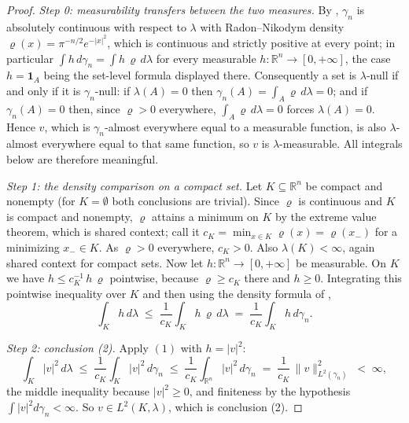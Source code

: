 \begin{proof}
\emph{Step 0: measurability transfers between the two measures.}
By , $\gamma_n$ is absolutely continuous with respect to
$\lambda$ with Radon--Nikodym density $\varrho(x) = \pi^{-n/2}e^{-|x|^2}$, which
is continuous and strictly positive at every point; in particular
$\int h \, d\gamma_n = \int h\,\varrho \, d\lambda$ for every measurable
$h : \mathbb{R}^n \to [0,+\infty]$, the case $h = \mathbf{1}_A$ being the
set-level formula displayed there.  Consequently a set is $\lambda$-null if and
only if it is $\gamma_n$-null: if $\lambda(A) = 0$ then
$\gamma_n(A) = \int_A \varrho \, d\lambda = 0$; and if $\gamma_n(A) = 0$ then,
since $\varrho > 0$ everywhere, $\int_A \varrho\,d\lambda = 0$ forces
$\lambda(A) = 0$.  Hence $v$, which is $\gamma_n$-almost everywhere equal to a
measurable function, is also $\lambda$-almost everywhere equal to that same
function, so $v$ is $\lambda$-measurable.  All integrals below are therefore
meaningful.

\emph{Step 1: the density comparison on a compact set.}
Let $K \subseteq \mathbb{R}^n$ be compact and nonempty (for $K = \emptyset$ both
conclusions are trivial).  Since $\varrho$ is continuous and $K$ is compact and
nonempty, $\varrho$ attains a minimum on $K$ by the extreme value theorem, which
is shared context; call it $c_K = \min_{x \in K} \varrho(x) = \varrho(x_-)$ for a
minimizing $x_- \in K$.  As $\varrho > 0$ everywhere, $c_K > 0$.  Also
$\lambda(K) < \infty$, again shared context for compact sets.  Now
let $h : \mathbb{R}^n \to [0,+\infty]$ be measurable.  On $K$ we have
$h \leq c_K^{-1}\, h\, \varrho$ pointwise, because $\varrho \geq c_K$ there and
$h \geq 0$.  Integrating this pointwise inequality over $K$ and then using the
density formula of ,
\begin{equation*}
  \int_K h \, d\lambda
    \;\leq\; \frac{1}{c_K} \int_K h\, \varrho \, d\lambda
    \;=\; \frac{1}{c_K} \int_K h \, d\gamma_n .
  \tag{1}
\end{equation*}

\emph{Step 2: conclusion (2).}
Apply $(1)$ with $h = |v|^2$:
\[
  \int_K |v|^2 \, d\lambda
    \;\leq\; \frac{1}{c_K} \int_K |v|^2 \, d\gamma_n
    \;\leq\; \frac{1}{c_K} \int_{\mathbb{R}^n} |v|^2 \, d\gamma_n
    \;=\; \frac{1}{c_K}\, \|v\|_{L^2(\gamma_n)}^2
    \;<\; \infty ,
\]
the middle inequality because $|v|^2 \geq 0$, and finiteness by the hypothesis
$\int |v|^2 d\gamma_n < \infty$.  So $v \in L^2(K,\lambda)$, which is conclusion (2).


\end{proof}

